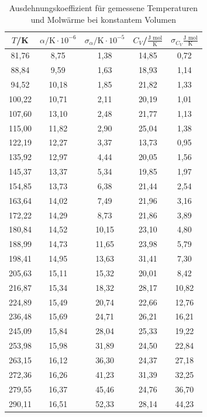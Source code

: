 \begin{table}[H]
	\begin{center}
		\begin{tabular}{c c c c c}
			\toprule
			\(T\)/K & \(\alpha/\text{K}\cdot10^{-6}\) & \(\sigma_\alpha/\text{K}\cdot10^{-5}\) & \(C_V\)/\(\frac{\text{J mol}}{\text{K}}\) & \(\sigma_{C_V}\)\(\frac{\text{J mol}}{\text{K}}\) \\
			\midrule
			81,76&	8,75		&1,38	&14,85	&0,72\\
			88,84&	9,59		&1,63	&18,93	&1,14\\
			94,52&	10,18	&1,85	&21,82	&1,33\\
			100,22&	10,71	&2,11	&20,19	&1,01\\
			107,60&	13,10	&2,48	&21,77	&1,13\\
			115,00&	11,82	&2,90	&25,04	&1,38\\
			122,19&	12,27	&3,37	&13,73	&0,95\\
			135,92&	12,97	&4,44	&20,05	&1,56\\
			145,37&	13,37	&5,34	&19,85	&1,97\\
			154,85&	13,73	&6,38	&21,44	&2,54\\
			163,64&	14,02	&7,49	&21,96	&3,16\\
			172,22&	14,29	&8,73	&21,86	&3,89\\
			180,84&	14,52	&10,15	&23,10	&4,80\\
			188,99&	14,73	&11,65	&23,98	&5,79\\
			198,41&	14,95	&13,63	&31,41	&7,30\\
			205,63&	15,11	&15,32	&20,01	&8,42\\
			216,87&	15,34	&18,32	&28,17	&10,82\\
			224,89&	15,49	&20,74	&22,66	&12,76\\
			236,48&	15,69	&24,71	&26,21	&16,21\\
			245,09&	15,84	&28,04	&25,33	&19,22\\
			253,98&	15,98	&31,89	&24,50	&22,84\\
			263,15&	16,12	&36,30	&24,37	&27,18\\
			272,36&	16,26	&41,23	&31,39	&32,25\\
			279,55&	16,37	&45,46	&24,76	&36,70\\
			290,11&	16,51	&52,33	&28,14	&44,23\\
			\bottomrule
		\end{tabular}
		\caption{Ausdehnungskoeffizient für gemessene Temperaturen und Molwärme bei konstantem Volumen}
		\label{fig:tab4}
	\end{center}
\end{table}


